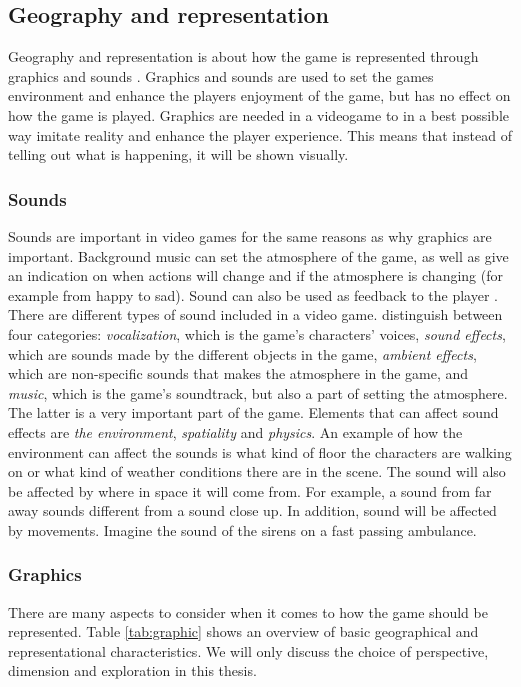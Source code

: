 \subsection{Geography and representation}
Geography and representation is about how the game is represented through graphics and sounds \cite{understandingvg}. Graphics and sounds are used to set the games environment and enhance the players enjoyment of the game, but has no effect on how the game is played. Graphics are needed in a videogame to in a best possible way imitate reality and enhance the player experience. This means that instead of telling out what is happening, it will be shown visually. 

\subsubsection{Sounds}
Sounds are important in video games for the same reasons as why graphics are important. Background music can set the atmosphere of the game, as well as give an indication on when actions will change and if the atmosphere is changing (for example from happy to sad). Sound can also be used as feedback to the player \cite{umlapproach}. There are different types of sound included in a  video game. \cite{understandingvg} distinguish between four categories:
\emph{vocalization}, which is the game’s characters’ voices,
\emph{sound effects}, which are sounds made by the different objects in the game, \emph{ambient effects}, which are non-specific sounds that makes the atmosphere in the game, and \emph{music}, which is the game’s soundtrack, but also a part of setting the atmosphere. The latter is a very important part of the game. Elements that can affect sound effects are \emph{the environment}, \emph{spatiality} and \emph{physics}. An example of how the environment can affect the sounds is what kind of floor the characters are walking on or what kind of weather conditions there are in the scene. The sound will also be affected by where in space it will come from. For example, a sound from far away sounds different from a sound close up. In addition, sound will be affected by movements. Imagine the sound of the sirens on a fast passing ambulance.

\subsubsection{Graphics}
There are many aspects to consider when it comes to how the game should be represented. Table \ref{tab:graphic} shows an overview of basic geographical and representational characteristics. We will only discuss the choice of perspective, dimension and exploration in this thesis. 

